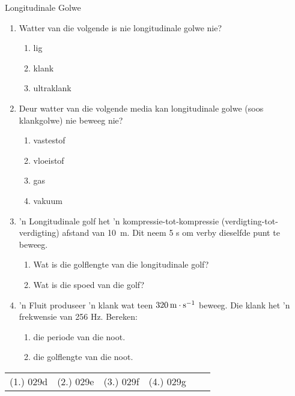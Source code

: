    \label{m38783*cid9}


\begin{eocexercises}{Longitudinale Golwe}
            \nopagebreak
\label{m38783*id293753}\begin{enumerate}[noitemsep, label=\textbf{\arabic*}. ] 
\item Watter van die volgende is nie longitudinale golwe nie?
\begin{enumerate}[noitemsep, label=\textbf{\alph*}. ] 
    \item lig
    \item klank
    \item ultraklank
\end{enumerate}
\item Deur watter van die volgende media kan longitudinale golwe (soos klankgolwe) nie beweeg nie?
\begin{enumerate}[noitemsep, label=\textbf{\alph*}. ] 
    \item vastestof
    \item vloeistof
    \item gas
    \item vakuum
\end{enumerate}

\par
\item 'n Longitudinale golf het 'n kompressie-tot-kompressie (verdigting-tot-verdigting) afstand van 10~m. Dit neem 5 s om verby dieselfde punt te beweeg.
\begin{enumerate}[noitemsep, label=\textbf{\alph*}. ] 
    \item Wat is die golflengte van die longitudinale golf?
    \item Wat is die spoed van die golf?
\end{enumerate}

\item 'n Fluit produseer 'n klank wat teen $320\phantom{\rule{2pt}{0ex}}\text{m}\ensuremath{\cdot}\text{s}{}^{-1}$ beweeg. Die klank het 'n frekwensie van 256 Hz. Bereken:
\begin{enumerate}[noitemsep, label=\textbf{\alph*}. ] 
    \item die periode van die noot.
    \item die golflengte van die noot.
\end{enumerate}
\end{enumerate}

\par \practiceinfo
\par \begin{tabular}[h]{cccccc}
(1.)	029d	&
(2.)	029e	&
(3.)	029f	&
(4.)	029g	&
\end{tabular}

\end{eocexercises}

